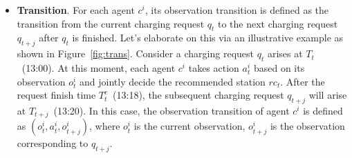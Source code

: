 \documentclass[sigconf]{acmart}
\newcommand\figref[1]{Figure~\ref{#1}}
\begin{document}
\begin{itemize}
	\item \textbf{Transition}. 
	For each agent $c^i$, its observation transition is defined as the transition from the current charging request $q_t$ to the next charging request $q_{t+j}$ after $q_t$ is finished.
	Let's elaborate on this via an illustrative example as shown in \figref{fig:trans}.
	Consider a charging request $q_t$ arises at  $T_t$~(13:00). 
	At this moment, each agent $c^i$ takes action $a_t^i$ based on its observation $o_t^i$ and jointly decide the recommended station $rc_t$.
	After the request finish time $T^c_t$~(13:18), the subsequent charging request $q_{t+j}$ will arise at $T_{t+j}$~(13:20).
	In this case, the observation transition of agent $c^i$ 
	is defined as $(o_t^i,a_t^i,o_{t+j}^i)$, where $o_t^i$ is the current observation, $o_{t+j}^i$ is the observation corresponding to $q_{t+j}$.
	

\end{itemize}
\end{document}

